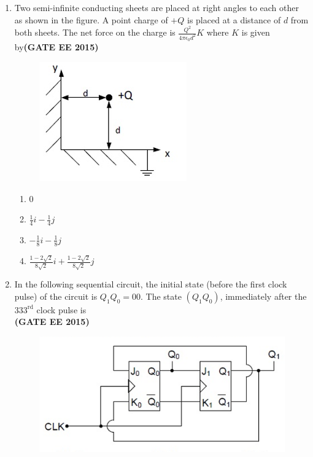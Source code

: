\documentclass[a4paper,12pt]{exam}
\theoremstyle{remark}
\begin{document}
\begin{enumerate}
\item Two semi-infinite conducting sheets are placed at right angles to each other as shown in the figure. A point charge of $+Q$ is placed at a distance of $d$ from both sheets. The net force on the charge is
$ \frac{Q^2}{4\pi \epsilon_0 d^2} K $
where $K$ is given by\hfill{\textbf{(GATE EE 2015)}}
\begin{figure}[H]
    \centering
    \includegraphics[width=0.4\columnwidth]{figs/2Q 46.png}
    \caption{}
    \label{fig:placeholder}
\end{figure}

  \begin{multicols}{4}
    \begin{enumerate}
        \item $0$
        \item $\frac{1}{4} i - \frac{1}{4} j$
        \item $-\frac{1}{8} i - \frac{1}{8} j$
        \item $\frac{1 - 2\sqrt{2}}{8\sqrt{2}} i + \frac{1 - 2\sqrt{2}}{8\sqrt{2}} j$
    \end{enumerate}
\end{multicols}
\item In the following sequential circuit, the initial state (before the first clock pulse) of the circuit is $Q_1Q_0 = 00$. The state $(Q_1 Q_0)$, immediately after the $333^{\text{rd}}$ clock pulse is\\\hfill{\textbf{(GATE EE 2015)}}
\begin{figure}[H]
    \centering
    \includegraphics[width=0.6\columnwidth]{figs/2Q 47.png}
    \caption{}
    \label{fig:placeholder}
\end{figure}


\end{enumerate}
\end{document}
